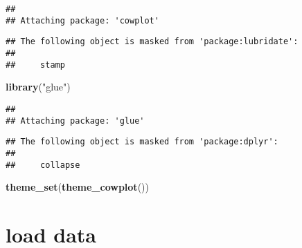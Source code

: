 \documentclass[
]{article}
\newenvironment{Shaded}{\begin{snugshade}}{\end{snugshade}}
\newcommand{\DataTypeTok}[1]{\textcolor[rgb]{0.13,0.29,0.53}{#1}}
\newcommand{\KeywordTok}[1]{\textcolor[rgb]{0.13,0.29,0.53}{\textbf{#1}}}
\newcommand{\NormalTok}[1]{#1}
\newcommand{\OperatorTok}[1]{\textcolor[rgb]{0.81,0.36,0.00}{\textbf{#1}}}
\newcommand{\StringTok}[1]{\textcolor[rgb]{0.31,0.60,0.02}{#1}}
\begin{document}
\begin{verbatim}
## 
## Attaching package: 'cowplot'
\end{verbatim}

\begin{verbatim}
## The following object is masked from 'package:lubridate':
## 
##     stamp
\end{verbatim}

\begin{Shaded}
\begin{Highlighting}[]
\KeywordTok{library}\NormalTok{(}\StringTok{"glue"}\NormalTok{)}
\end{Highlighting}
\end{Shaded}

\begin{verbatim}
## 
## Attaching package: 'glue'
\end{verbatim}

\begin{verbatim}
## The following object is masked from 'package:dplyr':
## 
##     collapse
\end{verbatim}

\begin{Shaded}
\begin{Highlighting}[]
\KeywordTok{theme_set}\NormalTok{(}\KeywordTok{theme_cowplot}\NormalTok{())}
\end{Highlighting}
\end{Shaded}

\hypertarget{load-data}{%
\section{load data}\label{load-data}}

\begin{Shaded}
\end{Shaded}
\end{document}
